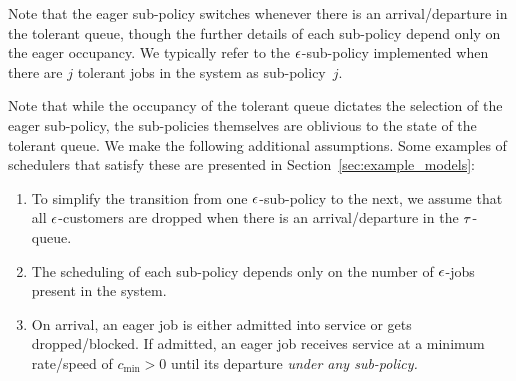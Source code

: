 Note that the eager sub-policy switches whenever there is an
arrival/departure in the tolerant queue, though the further details of
each sub-policy depend only on the eager occupancy.
We typically refer to the ${ \epsilon }$-sub-policy implemented when there are
$j$ tolerant jobs in the system as sub-policy~$j.$

 Note that while the occupancy of the
tolerant queue dictates the selection of the eager sub-policy, the
sub-policies themselves are oblivious to the state of the tolerant
queue.
%
We make the following additional assumptions.  Some examples of
schedulers that satisfy these are presented in
Section~\ref{sec:example_models}:
\begin{enumerate}[{\bf A}.1]
\item To simplify the transition from one ${ \epsilon }$-sub-policy to the next,
  we assume that all ${ \epsilon }$-customers are dropped when there is an
  arrival/departure in the ${\tau}$-queue.
\item The scheduling of each sub-policy depends only on the number of
  ${ \epsilon }$-jobs present in the system.
\item On arrival, an eager job is either admitted into service or gets
  dropped/blocked. If admitted, an eager job receives service at a
  minimum rate/speed of $c_{\min} > 0$ until its departure \emph{under
    any sub-policy.}
\end{enumerate}
%

